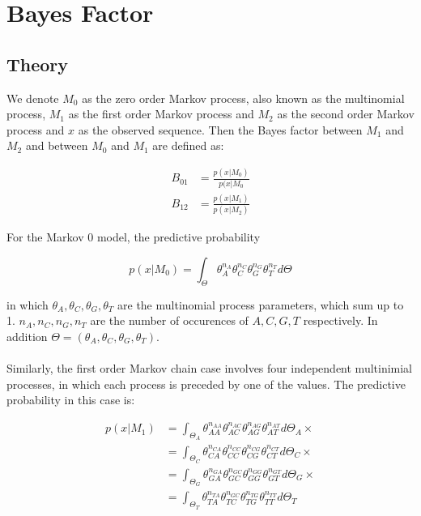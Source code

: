 \documentclass[paper=a4, fontsize=11pt]{scrartcl} %
\numberwithin{equation}{section} %
\numberwithin{figure}{section} %
\numberwithin{table}{section} %
\begin{document}



\section{Bayes Factor}

\subsection {Theory}

We denote $M_0$ as the zero order Markov process, also known as the multinomial process, $M_1$ as the first order Markov process and $M_2$ as the second order Markov process and $x$ as the observed sequence. Then the Bayes factor between $M_1$ and $M_2$ and between $M_0$ and $M_1$ are defined as:

\begin {align*}
  B_{01} &= \frac {p (x| M_0)} {p(x | M_0} \\
  B_{12} &= \frac {p (x| M_1)} {p(x | M_2)}
\end {align*}

For the Markov 0 model, the predictive probability 

\begin {equation}
p (x| M_0) = \int_{\Theta} \theta_{A}^{n_{A}} \theta_{C}^{n_{C}} \theta_{G}^{n_{G}} \theta_{T}^{n_{T}} d\Theta
\end {equation}

in which $\theta_A, \theta_C, \theta_G, \theta_T$ are the multinomial process parameters, which sum up to 1. $n_A, n_C, n_G, n_T$ are the number of occurences of ${A, C, G, T}$ respectively. In addition $\Theta = (\theta_A, \theta_C, \theta_G, \theta_T)$.
\\\\
Similarly, the first order Markov chain case involves four independent multinimial processes, in which each process is preceded by one of the values. The predictive probability in this case is:

\begin {align*}
p (x| M_1) &= \int_{\Theta_A} \theta_{AA}^{n_{AA}} \theta_{AC}^{n_{AC}} \theta_{AG}^{n_{AG}} \theta_{AT}^{n_{AT}} d\Theta_A \times\\
&= \int_{\Theta_C} \theta_{CA}^{n_{CA}} \theta_{CC}^{n_{CC}} \theta_{CG}^{n_{CG}} \theta_{CT}^{n_{CT}} d\Theta_C \times \\
&= \int_{\Theta_G} \theta_{GA}^{n_{GA}} \theta_{GC}^{n_{GC}} \theta_{GG}^{n_{GG}} \theta_{GT}^{n_{GT}} d\Theta_G \times \\
&= \int_{\Theta_T} \theta_{TA}^{n_{TA}} \theta_{TC}^{n_{GC}} \theta_{TG}^{n_{TG}} \theta_{TT}^{n_{TT}} d\Theta_T \\
\end {align*}
\end{document}

